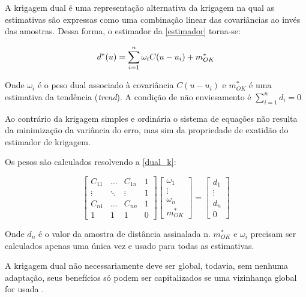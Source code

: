  \label{dksection}

A krigagem dual \cite{royer1984dual} é uma representação alternativa da krigagem na qual as estimativas são expressas como uma combinação linear das covariâncias ao invés das amostras. Dessa forma, o estimador da \autoref{estimador} torna-se:

\begin{equation}
\label{dk}
d^*(u)=\sum_{i=1}^{n} \omega_i C(u-u_i) + m^*_{OK} \\
\end{equation}

Onde $\omega_i$ é o peso dual associado à covariância $C(u-u_i)$ e $m^*_{OK}$ é uma estimativa da tendência (\textit{trend}). A condição de não enviesamento é $\sum_{i=1}^{n} d_i=0$

Ao contrário da krigagem simples e ordinária o sistema de equações não resulta da minimização da variância do erro, mas sim da propriedade de exatidão do estimador de krigagem.

Os pesos são calculados resolvendo a \autoref{dual_k}:

\begin{equation}
    \label{dual_k}
    \begin{bmatrix} 
    C_{11}&\dots&C_{1n}&1\\
    \vdots&\ddots&\vdots&1\\
    C_{n1}&\dots&C_{nn}&1\\ 
    1&1&1&0
    \end{bmatrix}
    \begin{bmatrix} 
    \omega_{1}\\
    \vdots\\
    \omega_{n}\\ 
    m^*_{OK}
    \end{bmatrix}
    =
    \begin{bmatrix} 
    d_{1}\\
    \vdots\\
    d_{n}\\ 
    0
    \end{bmatrix}
\end{equation}

Onde $d_{n}$ é o valor da amostra de distância assinalada n. $m^*_{OK}$ e $\omega_i$ precisam ser calculados apenas uma única vez e usado para todas as estimativas.

A krigagem dual não necessariamente deve ser global, todavia, sem nenhuma adaptação, seus benefícios só podem ser capitalizados se uma vizinhança global for usada \cite{aunon2000dual}.

